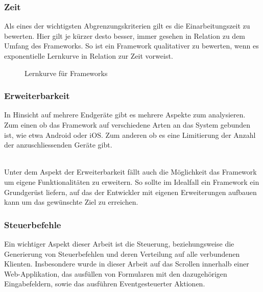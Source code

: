 	\subsubsection{Zeit}
	Als eines der wichtigsten Abgrenzungskriterien gilt es die Einarbeitungszeit zu bewerten. Hier gilt je kürzer desto besser, immer gesehen in Relation 	zu dem Umfang des Frameworks. So ist ein Framework qualitativer zu bewerten, wenn es exponentielle Lernkurve in Relation zur Zeit vorweist.

\begin{figure}[H]
	\centering
	\vspace{-25pt}
	\caption[Darstellung der Lernkurve für Frameworks]{Lernkurve für Frameworks}
\end{figure}
\vspace{-40pt}


	\pagebreak
	 \subsubsection{Erweiterbarkeit}
	 In Hinsicht auf mehrere Endgeräte gibt es mehrere Aspekte zum analysieren. Zum einen ob das Framework auf verschiedene 	Arten an das System gebunden ist, wie etwa Android oder iOS. Zum anderen ob es eine Limitierung der Anzahl der 				anzuschliessenden Geräte gibt. 

	\\Unter dem Aspekt der Erweiterbarkeit fällt auch die Möglichkeit das Framework um eigene Funktionalitäten zu erweitern. So 		sollte im Idealfall ein Framework ein Grundgerüst liefern, auf das der Entwickler mit eigenen Erweiterungen aufbauen kann um 	das gewünschte Ziel zu erreichen.
	
	\subsubsection{Steuerbefehle}
	Ein wichtiger Aspekt dieser Arbeit ist die Steuerung, beziehungsweise die Generierung von Steuerbefehlen und deren Verteilung auf alle verbundenen Klienten. Insbesondere wurde in dieser Arbeit auf das Scrollen innerhalb einer \mbox{Web-Applikation}, das ausfüllen von Formularen mit den dazugehörigen Eingabefeldern, sowie das ausführen Eventgesteuerter Aktionen.

